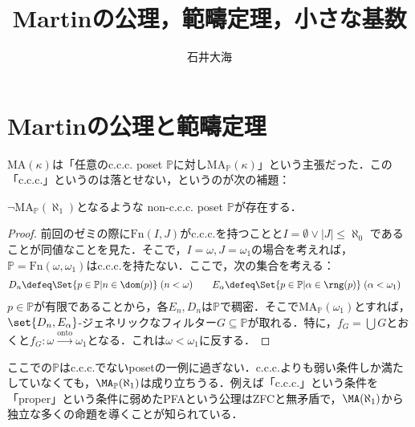 \documentclass[a4j]{bxjsarticle}
\title{Martinの公理，範疇定理，小さな基数}
\author{石井大海}
\theoremstyle{definition}
\begin{document}
\maketitle
\section{Martinの公理と範疇定理}
$\mathrm{MA}(\kappa)$は「任意のc.c.c. poset $\mathbb{P}$に対し$\mathrm{MA}_\mathbb{P}(\kappa)$」という主張だった．この「c.c.c.」というのは落とせない，というのが次の補題：

\begin{lemma}
 $\neg \mathrm{MA}_{\mathbb{P}}(\aleph_1)$となるような non-c.c.c. poset $\mathbb{P}$が存在する．
\end{lemma}
\begin{proof}
 前回のゼミの際に$\mathrm{Fn}(I, J)$がc.c.c.を持つことと$I = \emptyset \vee |J| \leq \aleph_0$ であることが同値なことを見た．そこで，$I = \omega, J = \omega_1$の場合を考えれば，$\mathbb{P} = \mathrm{Fn}(\omega, \omega_1)$はc.c.c.を持たない．ここで，次の集合を考える：
 \begin{align*}
  D_n \defeq \Set{ p \in \mathbb{P} | n \in \dom(p)} & \;(n < \omega) & \quad E_\alpha \defeq \Set{ p \in \mathbb{P} | \alpha \in \rng(p)} & \; (\alpha < \omega_1)
 \end{align*}
 $p \in \mathbb{P}$が有限であることから，各$E_n, D_n$は$\mathbb{P}$で稠密．そこで$\mathrm{MA}_{\mathbb{P}}(\omega_1)$とすれば，$\set{D_n, E_\alpha}$-ジェネリックなフィルター$G \subseteq \mathbb{P}$が取れる．特に，$f_G = \bigcup G$とおくと$f_G : \omega \xrightarrow{\text{onto}} \omega_1$となる．これは$\omega < \omega_1$に反する．\mbox{}
\end{proof}

ここでの$\mathbb{P}$はc.c.c.でないposetの一例に過ぎない．c.c.c.よりも弱い条件しか満たしていなくても，$\MA_\mathbb{P}(\aleph_1)$は成り立ちうる．例えば「c.c.c.」という条件を「proper」という条件に弱めたPFAという公理はZFCと無矛盾で，$\MA(\aleph_1)$から独立な多くの命題を導くことが知られている．
\end{document}
